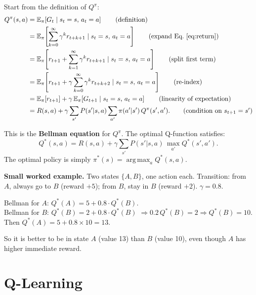 \documentclass[12pt,a4paper]{article}
\DeclareMathOperator*{\argmax}{arg\,max}
\begin{document}
Start from the definition of $Q^\pi$:
\begin{align}
  Q^\pi(s,a)
  &= \mathbb{E}_\pi\!\left[G_t \mid s_t=s,\, a_t=a\right] \tag{definition}\\
  &= \mathbb{E}_\pi\!\left[\sum_{k=0}^{\infty} \gamma^k r_{t+k+1}
     \mid s_t=s,\, a_t=a\right] \tag{expand Eq.~\ref{eq:return}}\\
  &= \mathbb{E}_\pi\!\left[r_{t+1}
     + \sum_{k=1}^{\infty} \gamma^k r_{t+k+1}
     \mid s_t=s,\, a_t=a\right] \tag{split first term}\\
  &= \mathbb{E}_\pi\!\left[r_{t+1}
     + \gamma \sum_{k=0}^{\infty} \gamma^k r_{t+k+2}
     \mid s_t=s,\, a_t=a\right] \tag{re-index}\\
  &= \mathbb{E}_\pi\!\left[r_{t+1}\right]
     + \gamma\, \mathbb{E}_\pi\!\left[G_{t+1} \mid s_t=s,\, a_t=a\right]
     \tag{linearity of expectation}\\
  &= R(s,a) + \gamma \sum_{s'} P(s'|s,a)
     \sum_{a'} \pi(a'|s')\, Q^\pi(s',a').
     \tag{condition on $s_{t+1}=s'$}
\end{align}

This is the \textbf{Bellman equation} for $Q^\pi$.
The optimal Q-function satisfies:
\begin{equation}
  \boxed{Q^*(s,a) = R(s,a) + \gamma \sum_{s'} P(s'|s,a)\, \max_{a'} Q^*(s',a').}
  \label{eq:bellman_opt}
\end{equation}
The optimal policy is simply $\pi^*(s) = \argmax_a Q^*(s,a)$.

\begin{exbox}
\textbf{Small worked example.}
Two states $\{A, B\}$, one action each.  Transition: from $A$, always go
to $B$ (reward $+5$); from $B$, stay in $B$ (reward $+2$).  $\gamma=0.8$.

Bellman for $A$: $Q^*(A) = 5 + 0.8 \cdot Q^*(B)$.\\
Bellman for $B$: $Q^*(B) = 2 + 0.8 \cdot Q^*(B)$
$\Rightarrow 0.2\, Q^*(B) = 2 \Rightarrow Q^*(B) = 10$.\\
Then $Q^*(A) = 5 + 0.8 \times 10 = 13$.

So it is better to be in state $A$ (value 13) than $B$ (value 10), even
though $A$ has higher immediate reward.
\end{exbox}

\section{Q-Learning}
\end{document}
